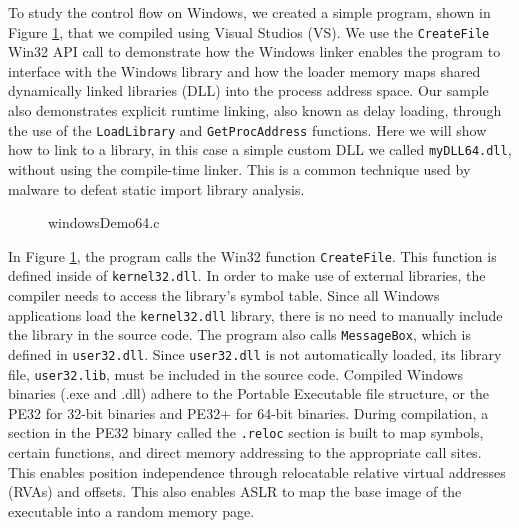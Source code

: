 \documentclass[preprint,12pt]{elsarticle}
\begin{document}
To study the control flow on Windows, we created a simple program, shown in Figure \ref{fig:windowsDemo64.c}, that we compiled using Visual Studios (VS). We use the \texttt{CreateFile} Win32 API call to demonstrate how the Windows linker enables the program to interface with the Windows library and how the loader memory maps shared dynamically linked libraries (DLL) into the process address space. Our sample also demonstrates explicit runtime linking, also known as delay loading, through the use of the \texttt{LoadLibrary} and \texttt{GetProcAddress} functions. Here we will show how to link to a library, in this case a simple custom DLL we called \texttt{myDLL64.dll}, without using the compile-time linker. This is a common technique used by malware to defeat static import library analysis.

\begin{figure}[ht]
\caption{windowsDemo64.c}
\label{fig:windowsDemo64.c}
\end{figure}

In Figure \ref{fig:windowsDemo64.c}, the program calls the Win32 function \texttt{CreateFile}. This function is defined inside of \texttt{kernel32.dll}. In order to make use of external libraries, the compiler needs to access the library's symbol table. Since all Windows applications load the \texttt{kernel32.dll} library, there is no need to manually include the library in the source code. The program also calls \texttt{MessageBox}, which is defined in \texttt{user32.dll}. Since \texttt{user32.dll} is not automatically loaded, its library file, \texttt{user32.lib}, must be included in the source code. Compiled Windows binaries (.exe and .dll) adhere to the Portable Executable file structure, or the PE32 for 32-bit binaries and PE32+ for 64-bit binaries. During compilation, a section in the PE32 binary called the \texttt{.reloc} section is built to map symbols, certain functions, and direct memory addressing to the appropriate call sites. This enables position independence through relocatable relative virtual addresses (RVAs) and offsets. This also enables ASLR to map the base image of the executable into a random memory page.
\end{document}
